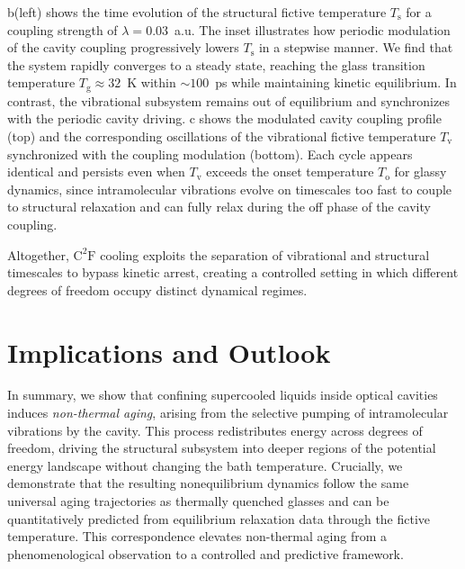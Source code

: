 \documentclass[aps, prl,
 reprint,
 superscriptaddress,
 citeautoscript,  %
 amsmath,amssymb,
 tightenlines
]{revtex4-2}
\begin{document}
b(left) shows the time evolution of the structural fictive temperature $T_\mathrm{s}$ for a coupling strength of $\lambda = 0.03$~a.u. The inset illustrates how periodic modulation of the cavity coupling progressively lowers $T_\mathrm{s}$ in a stepwise manner. We find that the system rapidly converges to a steady state, reaching the glass transition temperature $T_\mathrm{g} \approx 32$~K within $\sim 100$~ps while maintaining kinetic equilibrium. In contrast, the vibrational subsystem remains out of equilibrium and synchronizes with the periodic cavity driving. c shows the modulated cavity coupling profile (top) and the corresponding oscillations of the vibrational fictive temperature $T_\mathrm{v}$ synchronized with the coupling modulation (bottom). Each cycle appears identical and persists even when $T_\mathrm{v}$ exceeds the onset temperature $T_\mathrm{o}$ for glassy dynamics, since intramolecular vibrations evolve on timescales too fast to couple to structural relaxation and can fully relax during the off phase of the cavity coupling.

Altogether, $\mathrm{C^2F}$ cooling exploits the separation of vibrational and structural timescales to bypass kinetic arrest, creating a controlled setting in which different degrees of freedom occupy distinct dynamical regimes.

\section*{Implications and Outlook}

In summary, we show that confining supercooled liquids inside optical cavities induces \textit{non-thermal aging}, arising from the selective pumping of intramolecular vibrations by the cavity. This process redistributes energy across degrees of freedom, driving the structural subsystem into deeper regions of the potential energy landscape without changing the bath temperature. Crucially, we demonstrate that the resulting nonequilibrium dynamics follow the same universal aging trajectories as thermally quenched glasses and can be quantitatively predicted from equilibrium relaxation data through the fictive temperature. This correspondence elevates non-thermal aging from a phenomenological observation to a controlled and predictive framework.
\end{document}
